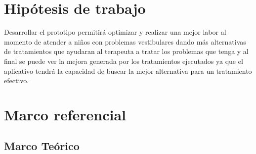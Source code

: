 \section{Hipótesis de trabajo}
	Desarrollar el prototipo permitirá optimizar y realizar una mejor labor al momento de atender a niños con problemas vestibulares dando más alternativas de tratamientos que ayudaran al terapeuta a tratar los problemas que tenga y al final se puede ver la mejora generada por los tratamientos ejecutados ya que el aplicativo tendrá la capacidad de buscar la mejor alternativa para un tratamiento efectivo.\\
\section{Marco referencial}
	\subsection{Marco Teórico}
